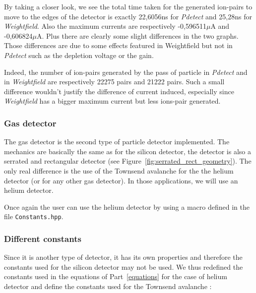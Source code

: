 \documentclass[11pt]{article}
\begin{document}
				By taking a closer look, we see the total time taken for the generated ion-pairs to move to the edges of the
				detector is exactly 22,6056ns for \textit{Pdetect} and 25,28ns for \textit{Weightfield}. Also the maximum
				currents are respectively -0,596511$\mu$A and -0,606824$\mu$A. Plus there are clearly some slight
				differences in the two graphs. Those differences are due to some effects featured in Weightfield
				but not in \textit{Pdetect} such as the depletion voltage or the gain.

				Indeed, the number of ion-pairs generated by the pass of particle in \textit{Pdetect} and in \textit{Weightfield}
				are respectively 22275 pairs and 21222 pairs. Such a small difference wouldn't justify the difference
				of current induced, especially since \textit{Weightfield} has a bigger maximum current but less ions-pair generated.

		\subsubsection{Gas detector}

			The gas detector is the second type of particle detector implemented. The mechanics are basically
			the same as for the silicon detector, the detector is also a serrated and rectangular detector
			(see Figure~\ref{fig:serrated_rect_geometry}). The only real difference is the use of the Townsend
			avalanche for the the helium detector (or for any other gas detector). In those applications, we
			will use an helium detector.

			Once again the user can use the helium detector by using a macro defined in the file
			\texttt{Constants.hpp}.

			\subsubsection*{Different constants}

				Since it is another type of detector, it has its own properties and therefore the constants
				used for the silicon detector may not be used. We thus redefined the constants used in the
				equations of Part~\ref{equations} for the case of helium detector and define the constants
				used for the Townsend avalanche :
\end{document}
